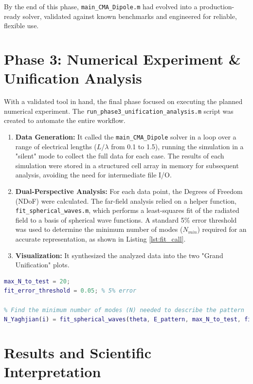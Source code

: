 \documentclass[11pt, a4paper]{article}
\begin{document}
By the end of this phase, \texttt{main\_CMA\_Dipole.m} had evolved into a production-ready solver, validated against known benchmarks and engineered for reliable, flexible use.

\section{Phase 3: Numerical Experiment \& Unification Analysis}

With a validated tool in hand, the final phase focused on executing the planned numerical experiment. The \texttt{run\_phase3\_unification\_analysis.m} script was created to automate the entire workflow.
\begin{enumerate}
    \item \textbf{Data Generation:} It called the \texttt{main\_CMA\_Dipole} solver in a loop over a range of electrical lengths ($L/\lambda$ from 0.1 to 1.5), running the simulation in a "silent" mode to collect the full data for each case. The results of each simulation were stored in a structured cell array in memory for subsequent analysis, avoiding the need for intermediate file I/O.
    \item \textbf{Dual-Perspective Analysis:} For each data point, the Degrees of Freedom (NDoF) were calculated. The far-field analysis relied on a helper function, \texttt{fit\_spherical\_waves.m}, which performs a least-squares fit of the radiated field to a basis of spherical wave functions. A standard 5\% error threshold was used to determine the minimum number of modes ($N_{min}$) required for an accurate representation, as shown in Listing \ref{lst:fit_call}.
    \item \textbf{Visualization:} It synthesized the analyzed data into the two "Grand Unification" plots.
\end{enumerate}

\begin{lstlisting}[language=Matlab, caption={Example call to the spherical wave fitting function within the analysis loop.}, label={lst:fit_call}]
% Set parameters for the spherical wave decomposition
max_N_to_test = 20;
fit_error_threshold = 0.05; % 5% error

% Find the minimum number of modes (N) needed to describe the pattern
N_Yaghjian(i) = fit_spherical_waves(theta, E_pattern, max_N_to_test, fit_error_threshold);
\end{lstlisting}

\section{Results and Scientific Interpretation}
\end{document}
